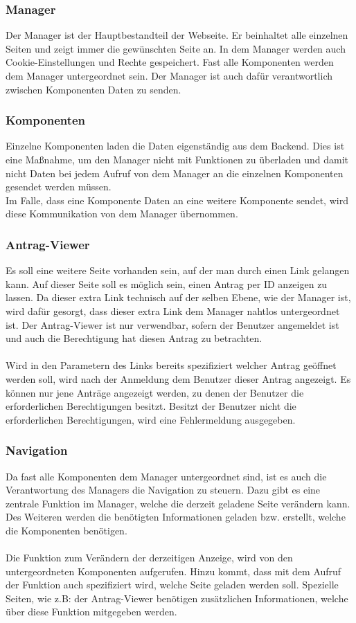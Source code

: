 \subsubsection{Manager}
Der Manager ist der Hauptbestandteil der Webseite. Er beinhaltet alle einzelnen Seiten und zeigt immer die gewünschten Seite an. In dem Manager werden auch Cookie-Einstellungen und Rechte gespeichert. Fast alle Komponenten werden dem Manager untergeordnet sein. Der Manager ist auch dafür verantwortlich zwischen Komponenten Daten zu senden.

\subsubsection{Komponenten}
Einzelne Komponenten laden die Daten eigenständig aus dem Backend. Dies ist eine Maßnahme, um den Manager nicht mit Funktionen zu überladen und damit nicht Daten bei jedem Aufruf von dem Manager an die einzelnen Komponenten gesendet werden müssen.\\
Im Falle, dass eine Komponente Daten an eine weitere Komponente sendet, wird diese Kommunikation von dem Manager übernommen.

\subsubsection{Antrag-Viewer}
Es soll eine weitere Seite vorhanden sein, auf der man durch einen Link gelangen kann. Auf dieser Seite soll es möglich sein, einen Antrag per ID anzeigen zu lassen. Da dieser extra Link technisch auf der selben Ebene, wie der Manager ist, wird dafür gesorgt, dass dieser extra Link dem Manager nahtlos untergeordnet ist. Der Antrag-Viewer ist nur verwendbar, sofern der Benutzer angemeldet ist und auch die Berechtigung hat diesen Antrag zu betrachten.
\\\\
Wird in den Parametern des Links bereits spezifiziert welcher Antrag geöffnet werden soll, wird nach der Anmeldung dem Benutzer dieser Antrag angezeigt. Es können nur jene Anträge angezeigt werden, zu denen der Benutzer die erforderlichen Berechtigungen besitzt. Besitzt der Benutzer nicht die erforderlichen Berechtigungen, wird eine Fehlermeldung ausgegeben.

\subsubsection{Navigation}
Da fast alle Komponenten dem Manager untergeordnet sind, ist es auch die Verantwortung des Managers die Navigation zu steuern. Dazu gibt es eine zentrale Funktion im Manager, welche die derzeit geladene Seite verändern kann. Des Weiteren werden die benötigten Informationen geladen bzw. erstellt, welche die Komponenten benötigen.
\\\\
Die Funktion zum Verändern der derzeitigen Anzeige, wird von den untergeordneten Komponenten aufgerufen. Hinzu kommt, dass mit dem Aufruf der Funktion auch spezifiziert wird, welche Seite geladen werden soll. Spezielle Seiten, wie z.B: der Antrag-Viewer benötigen zusätzlichen Informationen, welche über diese Funktion mitgegeben werden.

